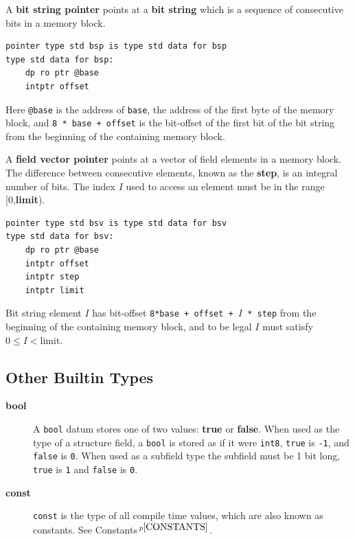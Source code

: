 \documentclass[12pt]{article}
\newcommand{\key}[1]{{\rm \bfseries #1}}
\newcommand{\pagnote}[1]{$\,^{p\pageref{#1}}$}
\newenvironment{indpar}[1][0.3in]%
	{\begin{list}{}%
		     {\setlength{\itemsep}{0in}%
		      \setlength{\topsep}{0in}%
		      \setlength{\parsep}{1ex}%
		      \setlength{\labelwidth}{#1}%
		      \setlength{\leftmargin}{#1}%
		      \addtolength{\leftmargin}{\labelsep}}%
	 \item}%
	{\end{list}}
\begin{document}
\begin{description}
\item[\key{bsp}] A \key{bit string pointer} points at a \key{bit string}
which is a sequence of consecutive bits in a memory block.
\begin{indpar}\begin{verbatim}
pointer type std bsp is type std data for bsp
type std data for bsp:
    dp ro ptr @base
    intptr offset
\end{verbatim}\end{indpar}
Here {\tt @base} is the address of {\tt base}, the address of the first
byte of the memory block, and {\tt 8 * base + offset} is
the bit-offset of the first bit of the bit string from the beginning
of the containing memory block.

\item[\key{bsv}] A \key{field vector pointer} points at a vector
of field elements in a memory block.  The
difference between consecutive elements, known as the \key{step},
is an integral number of bits.
The index $I$ used to access an element must be
in the range [0,\key{limit}).
\begin{indpar}\begin{verbatim}
pointer type std bsv is type std data for bsv
type std data for bsv:
    dp ro ptr @base
    intptr offset
    intptr step
    intptr limit
\end{verbatim}\end{indpar}
Bit string element $I$ has bit-offset {\tt 8*base + offset + $I$ * step}
from the beginning of the containing memory block,
and to be legal $I$ must satisfy $0\le I < \mathrm{limit}$.

\end{description}

\subsection{Other Builtin Types}

\begin{description}

\item[\key{bool}]\label{BOOL}  A {\tt bool} datum stores one of two values:
\key{true} or \key{false}.  When used as the type of a structure
field, a {\tt bool} is stored as if it were {\tt int8},
{\tt true} is {\tt -1}, and {\tt false} is {\tt 0}.  When used as
a subfield type the subfield must be 1 bit long, {\tt true} is {\tt 1}
and {\tt false} is {\tt 0}.

\item[\key{const}]  {\tt const} is the type of all compile time values,
which are also known as constants.  See Constants\pagnote{CONSTANTS}.

\end{description}
\end{document}

